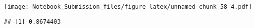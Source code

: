 \documentclass[
]{article}
\newenvironment{Shaded}{\begin{snugshade}}{\end{snugshade}}
\newcommand{\DecValTok}[1]{\textcolor[rgb]{0.00,0.00,0.81}{#1}}
\newcommand{\KeywordTok}[1]{\textcolor[rgb]{0.13,0.29,0.53}{\textbf{#1}}}
\newcommand{\NormalTok}[1]{#1}
\newcommand{\OperatorTok}[1]{\textcolor[rgb]{0.81,0.36,0.00}{\textbf{#1}}}
\newcommand{\StringTok}[1]{\textcolor[rgb]{0.31,0.60,0.02}{#1}}
\begin{document}
\texttt{[image: Notebook\_Submission\_files/figure-latex/unnamed-chunk-58-4.pdf]}

\begin{Shaded}
\end{Shaded}

\begin{verbatim}
## [1] 0.8674403
\end{verbatim}
\end{document}
